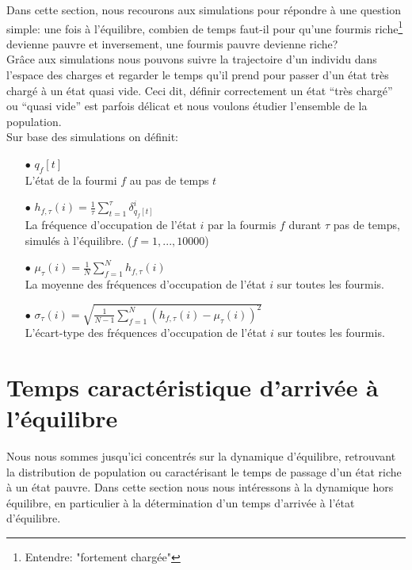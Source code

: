 Dans cette section, nous recourons aux simulations pour répondre à une question simple: une fois à l'équilibre, combien de temps faut-il pour qu'une fourmis riche\footnote{Entendre: "fortement chargée"} devienne pauvre et inversement, une fourmis pauvre devienne riche?\\

Grâce aux simulations nous pouvons suivre la trajectoire d'un individu dans l'espace des charges et regarder le temps qu'il prend pour passer d'un état très chargé à un état quasi vide. Ceci dit, définir correctement un état ``très chargé'' ou ``quasi vide'' est parfois délicat et nous voulons étudier l'ensemble de la population.\\


Sur base des simulations on définit:
\begin{itemize}

\item[$\bullet$] $q_f[t]$\\
L'état de la fourmi $f$ au pas de temps $t$

\item[$\bullet$] $h_{f,\tau}(i)=\frac{1}{\tau} \sum_{t=1}^{\tau}\delta_{q_f[t]}^i$ \\
La fréquence d'occupation de l'état $i$ par la fourmis $f$ durant $\tau$ pas de temps, simulés à l'équilibre. ($f=1,...,10000$)


\item[$\bullet$] $\mu_{\tau}(i) = \frac{1}{N}\sum_{f=1}^N h_{f,\tau}(i)$ \\
La moyenne des fréquences d'occupation de l'état $i$ sur toutes les fourmis.

\item[$\bullet$] $\sigma_{\tau}(i) = \sqrt{\frac{1}{N-1}\sum_{f=1}^N (h_{f,\tau}(i)-\mu_{\tau}(i))^2}$ \\
L'écart-type des fréquences d'occupation de l'état $i$ sur toutes les fourmis.\\
\end{itemize}


\section{Temps caractéristique d'arrivée à l'équilibre}

Nous nous sommes jusqu'ici concentrés sur la dynamique d'équilibre, retrouvant la distribution de population ou caractérisant le temps de passage d'un état riche à un état pauvre. Dans cette section nous nous intéressons à la dynamique hors équilibre, en particulier à la détermination d'un temps d'arrivée à l'état d'équilibre.\\

